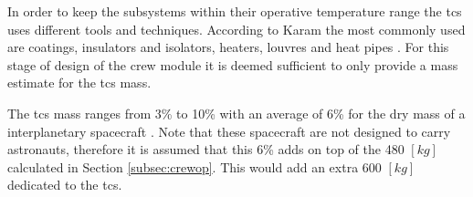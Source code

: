 In order to keep the subsystems within their operative temperature range the \gls{tcs} uses different tools and techniques. According to Karam the most commonly used are coatings, insulators and isolators, heaters, louvres and heat pipes \cite{Karam1998}. For this stage of design of the crew module it is deemed sufficient to only provide a mass estimate for the \gls{tcs} mass.

The \gls{tcs} mass ranges from 3\% to 10\% with an average of 6\% for the dry mass of a interplanetary spacecraft \cite[p.953]{Wertz2011}. Note that these spacecraft are not designed to carry astronauts, therefore it is assumed that this 6\% adds on top of the 480 $[kg]$ calculated in Section \ref{subsec:crewop}. This would add an extra 600 $[kg]$ dedicated to the \gls{tcs}.
